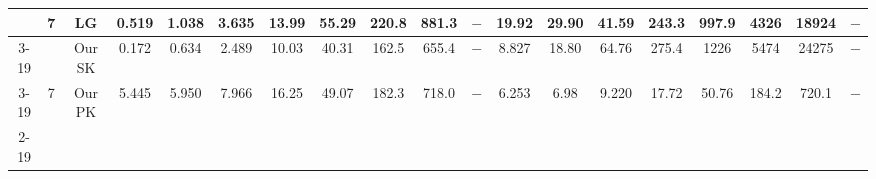 \begin{table}[]
{\begin{tabular}{|c|c|c|cccccccccccccccc|}
&\multirow{3}{*}{7}  & LG & \multicolumn{1}{c|}{0.519} & \multicolumn{1}{c|}{1.038} & \multicolumn{1}{c|}{3.635} & \multicolumn{1}{c|}{13.99} & \multicolumn{1}{c|}{55.29} & \multicolumn{1}{c|}{220.8} & \multicolumn{1}{c|}{881.3} & \multicolumn{1}{c|}{$-$} & \multicolumn{1}{c|}{19.92} & \multicolumn{1}{c|}{29.90} & \multicolumn{1}{c|}{41.59} & \multicolumn{1}{c|}{243.3} & \multicolumn{1}{c|}{997.9} & \multicolumn{1}{c|}{4326} & \multicolumn{1}{c|}{18924} & $-$ \\ \cline{3-19} 
 &  & Our SK & \multicolumn{1}{c|}{\cellcolor{blue!30}0.172} & \multicolumn{1}{c|}{\cellcolor{blue!30}0.634} & \multicolumn{1}{c|}{\cellcolor{blue!30}2.489} & \multicolumn{1}{c|}{\cellcolor{blue!30}10.03} & \multicolumn{1}{c|}{\cellcolor{blue!30}40.31} & \multicolumn{1}{c|}{\cellcolor{blue!30}162.5} & \multicolumn{1}{c|}{\cellcolor{blue!30}655.4} & \multicolumn{1}{c|}{$-$} & \multicolumn{1}{c|}{8.827} & \multicolumn{1}{c|}{18.80} & \multicolumn{1}{c|}{64.76} & \multicolumn{1}{c|}{275.4} & \multicolumn{1}{c|}{1226} & \multicolumn{1}{c|}{5474} & \multicolumn{1}{c|}{24275} & $-$ \\ \cline{3-19} 
 & \multirow{-3}{*}{7} & Our PK & \multicolumn{1}{c|}{5.445} & \multicolumn{1}{c|}{5.950} & \multicolumn{1}{c|}{7.966} & \multicolumn{1}{c|}{16.25} & \multicolumn{1}{c|}{49.07} & \multicolumn{1}{c|}{182.3} & \multicolumn{1}{c|}{718.0} & \multicolumn{1}{c|}{$-$} & \multicolumn{1}{c|}{\cellcolor{blue!30}6.253} & \multicolumn{1}{c|}{\cellcolor{blue!30}6.98} & \multicolumn{1}{c|}{\cellcolor{blue!30}9.220} & \multicolumn{1}{c|}{\cellcolor{blue!30}17.72} & \multicolumn{1}{c|}{\cellcolor{blue!30}50.76} & \multicolumn{1}{c|}{\cellcolor{blue!30}184.2} & \multicolumn{1}{c|}{\cellcolor{blue!30}720.1} & $-$ \\ \cline{2-19} 


\end{tabular}}
\end{table}
